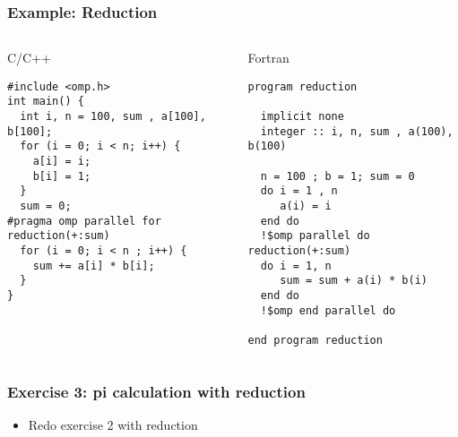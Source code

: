 \documentclass[c,mathserif,compress,xcolor=svgnames]{beamer}
\newenvironment{eblock}[0]
{
\begin{beamerboxesrounded}[upper=uppercol2,lower=lowercol2,shadow=true]}
{\end{beamerboxesrounded}}
\begin{document}
\begin{frame}[fragile]
  \frametitle{\small Example: Reduction}
  \begin{columns}
    \begin{eblock}{C/C++}
      {\tiny
        \begin{lstlisting}[basicstyle=\tiny\ttfamily,language=OmpC]
#include <omp.h>
int main() {
  int i, n = 100, sum , a[100], b[100];
  for (i = 0; i < n; i++) {
    a[i] = i;
    b[i] = 1;
  }
  sum = 0;
#pragma omp parallel for reduction(+:sum)
  for (i = 0; i < n ; i++) {
    sum += a[i] * b[i];
  }
}
        \end{lstlisting}
      }
    \end{eblock}
    \begin{eblock}{Fortran}
      {\tiny
        \begin{lstlisting}[basicstyle=\tiny\ttfamily,language=OmpFortran]
program reduction
  
  implicit none
  integer :: i, n, sum , a(100), b(100)

  n = 100 ; b = 1; sum = 0
  do i = 1 , n
     a(i) = i
  end do
  !$omp parallel do reduction(+:sum)
  do i = 1, n
     sum = sum + a(i) * b(i)
  end do
  !$omp end parallel do

end program reduction
        \end{lstlisting}
      }
    \end{eblock}
  \end{columns}
\end{frame}

\begin{frame}
  \frametitle{\small Exercise 3: pi calculation with reduction}
  \begin{itemize}
    \item Redo exercise 2 with reduction
  \end{itemize}
\end{frame}
\end{document}
